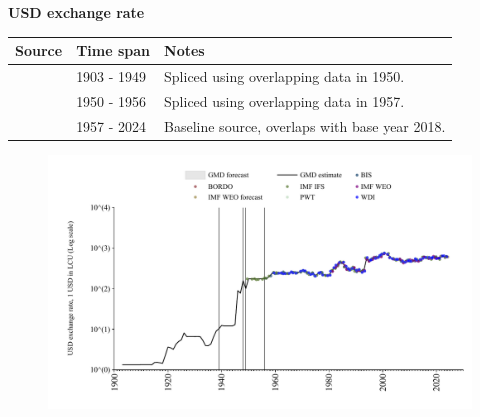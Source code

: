 \documentclass[12pt,a4paper,landscape]{article}
\begin{document}
\begin{adjustbox}{max totalsize={\paperwidth}{\paperheight},center}
\begin{minipage}[t][\textheight][t]{\textwidth}
\vspace*{0.5cm}
{}
\begin{center}
{\Large\bfseries USD exchange rate}
\end{center}
\vspace{0.5cm}
\begin{table}[H]
\centering
\small
\begin{tabular}{|l|l|l|}
\hline
\textbf{Source} & \textbf{Time span} & \textbf{Notes} \\
\hline
\rowcolor{white}\cite{JST}& 1903 - 1949 &Spliced using overlapping data in 1950. \\
\rowcolor{lightgray}\cite{IMF_IFS}& 1950 - 1956 &Spliced using overlapping data in 1957. \\
\rowcolor{white}\cite{BIS}& 1957 - 2024 &Baseline source, overlaps with base year 2018. \\
\hline
\end{tabular}
\end{table}
\begin{figure}[H]
\centering
\includegraphics[width=\textwidth,height=0.6\textheight,keepaspectratio]{graphs/SEN_USDfx.pdf}
\end{figure}
\end{minipage}
\end{adjustbox}
\end{document}
